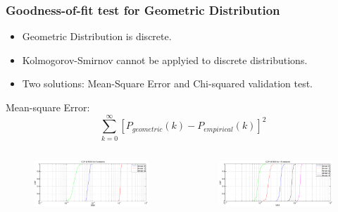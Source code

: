 \documentclass[9pt,handout,serif]{beamer}
\begin{document}
\begin{frame}[c]
	\frametitle{Goodness-of-fit test for Geometric Distribution}
	\begin{itemize}
		\item Geometric Distribution is discrete.
		\item Kolmogorov-Smirnov cannot be applyied to discrete distributions.
		\item Two solutions: Mean-Square Error and Chi-squared validation test.
	\end{itemize}
	Mean-square Error:
	\begin{equation}
		\sum_{k=0}^{\infty}[P_{geometric}(k) - P_{empirical}(k)]^2
	\end{equation}
	
	\begin{columns}
		\begin{figure}
			\centering
			\includegraphics[width=\textwidth]{../images/results/autocorrelation/localview/mse/8sessions_MSE}
		\end{figure}
		\begin{figure}
			\centering
			\includegraphics[width=\textwidth]{../images/results/autocorrelation/localview/mse/15sessions_MSE}
		\end{figure}
	\end{columns}
\end{frame}
\end{document}
